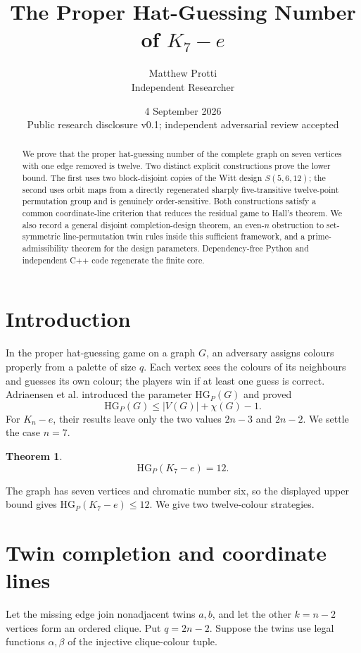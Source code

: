\documentclass[11pt]{article}
\title{The Proper Hat-Guessing Number of $K_7-e$}
\author{Matthew Protti\\\small Independent Researcher}
\date{4 September 2026\\\small Public research disclosure v0.1; independent adversarial review accepted}
\newtheorem{theorem}{Theorem}
\newcommand{\HGP}{\mathrm{HG}_{P}}
\begin{document}
\maketitle
\begin{abstract}
We prove that the proper hat-guessing number of the complete graph on seven
vertices with one edge removed is twelve. Two distinct explicit constructions
prove the lower bound. The first uses two block-disjoint copies of the Witt
design $S(5,6,12)$; the second uses orbit maps from a directly regenerated
sharply five-transitive twelve-point permutation group and is genuinely
order-sensitive. Both constructions satisfy a common coordinate-line
criterion that reduces the residual game to Hall's theorem. We also record a
general disjoint completion-design theorem, an even-$n$ obstruction to
set-symmetric line-permutation twin rules inside this sufficient framework,
and a prime-admissibility theorem for the design parameters. Dependency-free
Python and independent C++ code regenerate the finite core.
\end{abstract}

\section{Introduction}
In the proper hat-guessing game on a graph $G$, an adversary assigns colours
properly from a palette of size $q$. Each vertex sees the colours of its
neighbours and guesses its own colour; the players win if at least one guess is
correct. Adriaensen et al. introduced the parameter $\HGP(G)$ and proved
\[
  \HGP(G)\le |V(G)|+\chi(G)-1.
\]
For $K_n-e$, their results leave only the two values $2n-3$ and $2n-2$.
We settle the case $n=7$.

\begin{theorem}\label{thm:main}
\[
\HGP(K_7-e)=12.
\]
\end{theorem}

The graph has seven vertices and chromatic number six, so the displayed upper
bound gives $\HGP(K_7-e)\le12$. We give two twelve-colour strategies.

\section{Twin completion and coordinate lines}
Let the missing edge join nonadjacent twins $a,b$, and let the other
$k=n-2$ vertices form an ordered clique. Put $q=2n-2$. Suppose the twins use
legal functions $\alpha,\beta$ of the injective clique-colour tuple.
\end{document}
